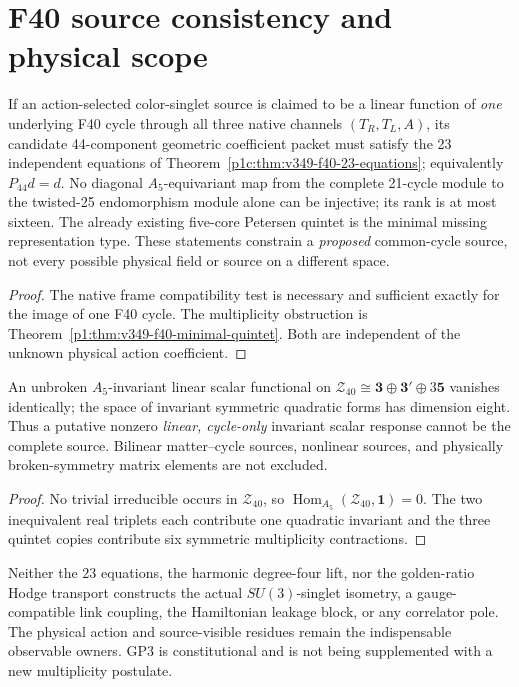 \documentclass[12pt,a4paper]{article}
\begin{document}
\clearpage
\section{F40 source consistency and physical scope}
\label{p10:sec:v349-f40-source-filter}
\begin{proposition}
\label{p10:prop:v349-f40-source-eligibility}
If an action-selected color-singlet source is claimed to be a
linear function of \emph{one} underlying F40 cycle through all
three native channels $(T_R,T_L,A)$, its candidate
44-component geometric coefficient packet must satisfy the
23 independent equations of
Theorem~\ref{p1c:thm:v349-f40-23-equations}; equivalently
$P_{44}d=d$.  No diagonal $A_5$-equivariant map from the
complete 21-cycle module to the twisted-25 endomorphism
module alone can be injective; its rank is at most sixteen.
The already existing five-core Petersen quintet is the
minimal missing representation type.  These statements
constrain a \emph{proposed} common-cycle source, not every
possible physical field or source on a different space.
\end{proposition}
\begin{proof}
The native frame compatibility test is necessary and
sufficient exactly for the image of one F40 cycle.  The
multiplicity obstruction is Theorem~\ref{p1:thm:v349-f40-minimal-quintet}.
Both are independent of the unknown physical action coefficient.
\end{proof}
\begin{corollary}
\label{p10:cor:v349-f40-linear-scalar-nogo}
An unbroken $A_5$-invariant linear scalar functional on
$\mathcal Z_{40}\cong\mathbf3\oplus\mathbf3'\oplus3\mathbf5$
vanishes identically; the space of invariant symmetric
quadratic forms has dimension eight.  Thus a putative
nonzero \emph{linear, cycle-only} invariant scalar response
cannot be the complete source.  Bilinear matter--cycle
sources, nonlinear sources, and physically broken-symmetry
matrix elements are not excluded.
\end{corollary}
\begin{proof}
No trivial irreducible occurs in $\mathcal Z_{40}$, so
$\operatorname{Hom}_{A_5}(\mathcal Z_{40},\mathbf1)=0$.
The two inequivalent real triplets each contribute one
quadratic invariant and the three quintet copies contribute
six symmetric multiplicity contractions.
\end{proof}
\begin{remark}
\label{p10:rem:v349-f40-source-action-open}
Neither the 23 equations, the harmonic degree-four lift,
nor the golden-ratio Hodge transport constructs the actual
$SU(3)$-singlet isometry, a gauge-compatible link coupling,
the Hamiltonian leakage block, or any correlator pole.
The physical action and source-visible residues remain the
indispensable observable owners.  GP3 is constitutional and is
not being supplemented with a new multiplicity postulate.
\end{remark}
\end{document}
